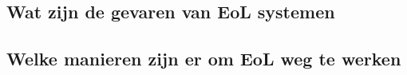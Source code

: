 \subsection{Wat zijn de gevaren van EoL systemen}

\subsection{Welke manieren zijn er om EoL weg te werken}







